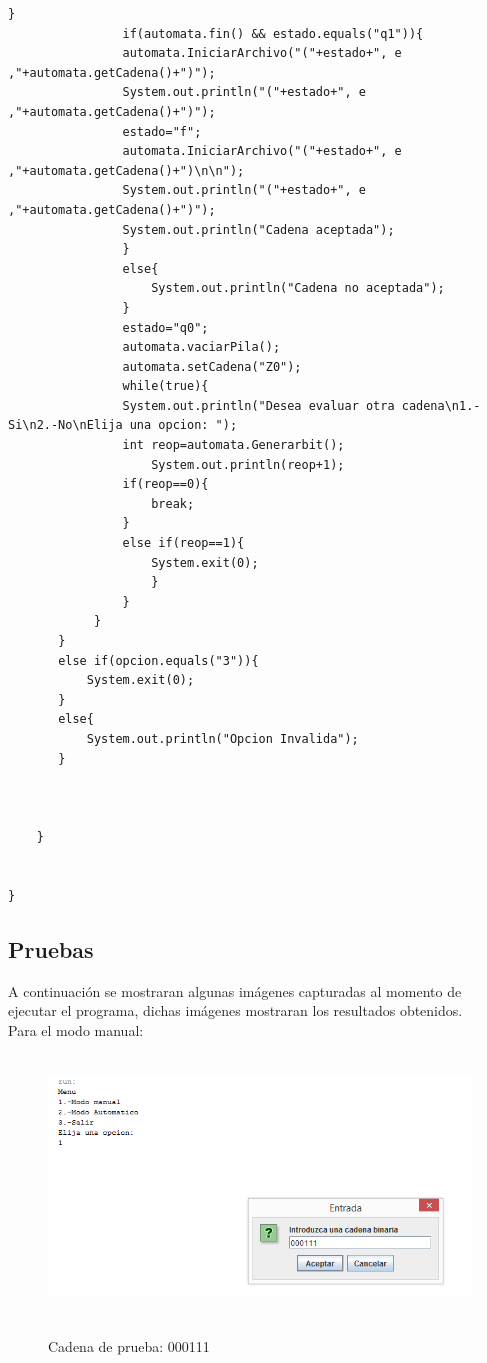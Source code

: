 \begin{lstlisting}[frame=single]
                }
                if(automata.fin() && estado.equals("q1")){
                automata.IniciarArchivo("("+estado+", e ,"+automata.getCadena()+")");
                System.out.println("("+estado+", e ,"+automata.getCadena()+")");
                estado="f";
                automata.IniciarArchivo("("+estado+", e ,"+automata.getCadena()+")\n\n");
                System.out.println("("+estado+", e ,"+automata.getCadena()+")");
                System.out.println("Cadena aceptada");
                }
                else{
                    System.out.println("Cadena no aceptada");
                }
                estado="q0";
                automata.vaciarPila();
                automata.setCadena("Z0");
                while(true){
                System.out.println("Desea evaluar otra cadena\n1.-Si\n2.-No\nElija una opcion: ");
                int reop=automata.Generarbit();
                    System.out.println(reop+1);
                if(reop==0){
                    break;
                }
                else if(reop==1){
                    System.exit(0);
                    }
                }        
            }
       }
       else if(opcion.equals("3")){
           System.exit(0);
       }
       else{
           System.out.println("Opcion Invalida");
       }
       
       
       
    }
       
      
}

\end{lstlisting}

\newpage

\subsection{Pruebas}
A continuaci\'on se mostraran algunas im\'agenes capturadas al momento de ejecutar el programa, dichas im\'agenes mostraran los resultados obtenidos.\\
\vspace{1.0cm}
Para el modo manual:\\
\begin{figure}[H]
\includegraphics[width=\textwidth, height=7cm]{ModoManualPila.png}
\label{fig:manual_pila}
\caption{Cadena de prueba: 000111}
\end{figure}

